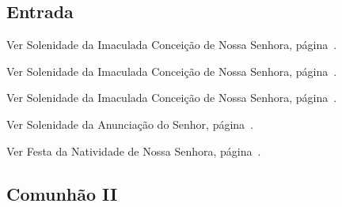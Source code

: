 
\subsection{Entrada}\label{subsection:communia/commune-bmv/introitus}

\begin{rubrica}
  Ver Solenidade da Imaculada Conceição de Nossa Senhora, página~\pageref{subsection:proprium-sanctorum/in-conceptione-immaculata-bmv/psalmus-responsorius}.
\end{rubrica}

\begin{rubrica}
  Ver Solenidade da Imaculada Conceição de Nossa Senhora, página~\pageref{subsection:proprium-sanctorum/in-conceptione-immaculata-bmv/alleluia}.
\end{rubrica}

\begin{rubrica}
  Ver Solenidade da Imaculada Conceição de Nossa Senhora, página~\pageref{subsection:proprium-sanctorum/in-conceptione-immaculata-bmv/psalmus-alleluiaticus}.
\end{rubrica}

\begin{rubrica}
  Ver Solenidade da Anunciação do Senhor, página~\pageref{subsection:proprium-sanctorum/in-annuntiatione-domini/offertorium}.
\end{rubrica}

\begin{rubrica}
  Ver Festa da Natividade de Nossa Senhora, página~\pageref{subsection:proprium-sanctorum/in-nativitate-bmv/communio}.
\end{rubrica}

\AllowPageFlush

\subsection{Comunhão II}\label{subsection:communia/commune-bmv/communio-2}
